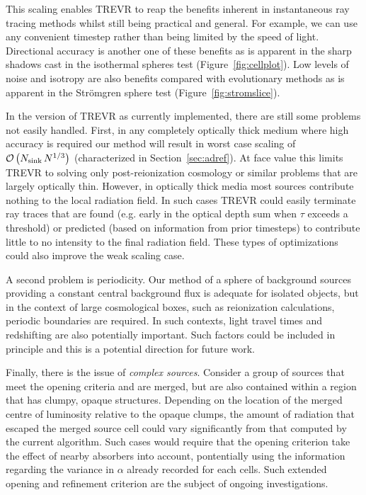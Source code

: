 \documentclass[fleq,usenatbib]{mnras}
\newcommand{\acro}{TREVR}
\newcommand{\bigO}[1]{\mathcal{O}\left(#1\right)}
\newcommand{\NK}{N_{\rm sink}}
\newcommand{\strom}{Str\"omgren}
\begin{document}
{This scaling enables \acro{} to reap the benefits inherent in instantaneous 
ray tracing methods whilst still being practical and general.  For example,
we can use any convenient timestep rather than being limited by the speed of 
light. Directional accuracy is another one of these benefits as is apparent in 
the sharp shadows cast in the isothermal spheres test 
(Figure~\ref{fig:cellplot}). Low levels of noise and isotropy are also 
benefits compared with evolutionary methods as is apparent in the \strom{} 
sphere test (Figure~\ref{fig:stromslice}).

In the version of \acro{} as currently implemented, there are still some 
problems not easily handled. First, in any completely optically thick 
medium where high accuracy is required our method will result in worst 
case scaling of $\bigO{\NK\,N^{1/3}}$ (characterized in Section~\ref{sec:adref}). 
At face value this limits \acro{} to solving only post-reionization cosmology or similar problems
that are largely optically thin.
However, in optically thick media most sources contribute nothing to the local radiation field. 
In such cases \acro{} could easily terminate ray traces that are found 
(e.g. early in the optical depth sum when $\tau$ exceeds a threshold)
or predicted (based on information from prior 
timesteps) to contribute little to no intensity to the final radiation field. These 
types of optimizations could also improve the weak scaling case.

A second problem is periodicity.  Our method of a sphere of background sources providing 
a constant central background flux is adequate for isolated objects, but in 
the context of large cosmological boxes, such as reionization calculations,
periodic boundaries are required.  In such contexts, light travel times
and redshifting are also potentially important.  Such factors could be included in principle
and this is a potential direction for future work.

Finally, there is the issue of \textit{complex sources}. 
Consider a group of sources that meet the opening criteria and are merged, 
but are also contained within a region that has clumpy, opaque structures. 
Depending on the location of the merged centre of luminosity relative to the 
opaque clumps, the amount of radiation that escaped the merged source cell 
could vary significantly from that computed by the current algorithm.
Such cases would require that the opening criterion take the effect of
nearby absorbers into account, pontentially using the information regarding
the variance in $\alpha$ already recorded for each cells.   Such extended opening
and refinement criterion are the subject of ongoing investigations.

}
\end{document}
